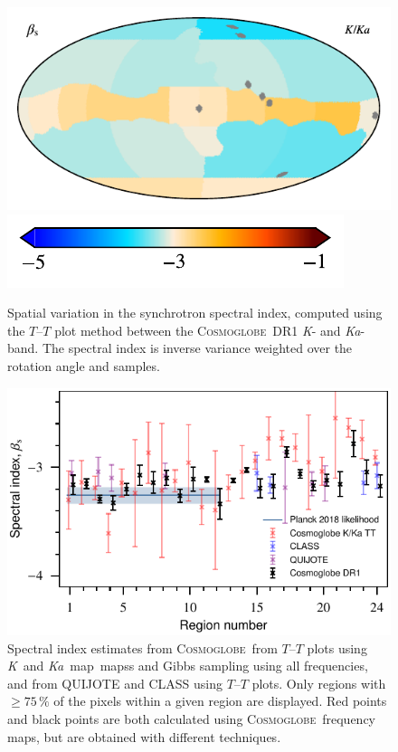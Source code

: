 \documentclass[twocolumn]{../../common/aa}
\newcommand{\cosmoglobe}{\textsc{Cosmoglobe}}
\newcommand{\Cosmoglobe}{\textsc{Cosmoglobe}}
\newcommand{\K}[0]{\textit K}
\newcommand{\Ka}[0]{\textit{Ka}}
\begin{document}
\begin{figure}
	\centering
	\includegraphics{figures/TT_map_CG_KKa.pdf}\vspace{-0.25cm}\\
	\hspace{0.25cm}\includegraphics{figures/cbar_beta_wide.pdf}
	\caption{Spatial variation in the synchrotron spectral index, computed using the $T$--$T$ plot method between the \Cosmoglobe\ DR1 \K- and \Ka-band. The spectral index is inverse variance weighted over the rotation angle and samples.}
        \label{fig:beta_map}
\end{figure}

\begin{figure}
	\centering
	\includegraphics[width=\columnwidth]{figures/compare_betas.pdf}
	\caption{Spectral index estimates from  \cosmoglobe\ from $T$--$T$ plots using \K\ and \Ka\ map\ mapss and Gibbs sampling using all frequencies, and from QUIJOTE and CLASS using $T$--$T$ plots.
	Only regions with $\geq75\,\%$ of the pixels within a given region are displayed.
	Red points and black points are both calculated using \cosmoglobe\ frequency maps, but are obtained with different techniques.
	}
	\label{fig:beta_comp}
\end{figure}
\end{document}
